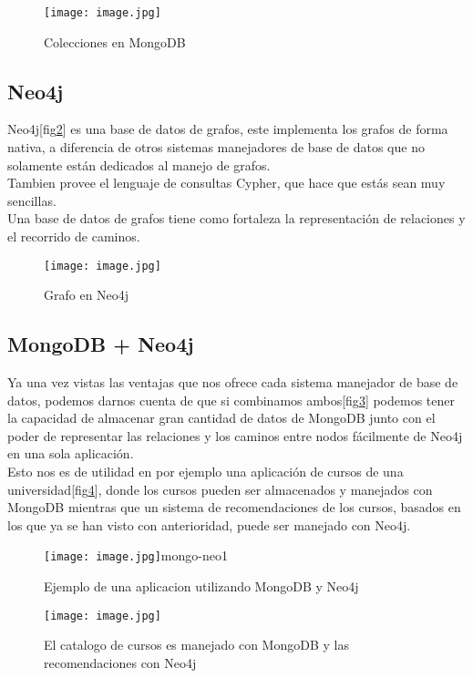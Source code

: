 \documentclass[conference,compsoc]{IEEEtran}
\begin{document}
\begin{figure}[!h]
\centering
\texttt{[image: image.jpg]}
\caption{Colecciones en MongoDB \cite{art11}}
\label{mongo_colecciones}
\end{figure}


\subsection{Neo4j}
Neo4j[fig\ref{neo-nodos}] es una base de datos de grafos, este implementa los grafos de forma nativa, a diferencia de otros sistemas manejadores de base de datos que no solamente están dedicados al manejo de grafos.\cite{art2}
\\
Tambien provee el lenguaje de consultas Cypher, que hace que estás sean muy sencillas.
\\
Una base de datos de grafos tiene como fortaleza la representación de relaciones y el recorrido de caminos.

\begin{figure}[!h]
\centering
\texttt{[image: image.jpg]}
\caption{Grafo en Neo4j \cite{art12}}
\label{neo-nodos}
\end{figure}

\subsection{MongoDB + Neo4j}
Ya una vez vistas las ventajas que nos ofrece cada sistema manejador de base de datos, podemos darnos cuenta de que si combinamos ambos[fig\ref{mongo-neo1}] podemos tener la capacidad de almacenar gran cantidad de datos de MongoDB junto con el poder de representar las relaciones y los caminos entre nodos fácilmente de Neo4j en una sola aplicación.
\\
Esto nos es de utilidad en por ejemplo una aplicación de cursos de una universidad[fig\ref{mongo-neo2}], donde los cursos pueden ser almacenados y manejados con MongoDB mientras que un sistema de recomendaciones de los cursos, basados en los que ya se han visto con anterioridad, puede ser manejado con Neo4j.

\begin{figure}[!h]
\centering
\texttt{[image: image.jpg]}{mongo-neo1}
\caption{Ejemplo de una aplicacion utilizando MongoDB y Neo4j\cite{art13}}
\label{mongo-neo1}
\end{figure}

\begin{figure}[!h]
\centering
\texttt{[image: image.jpg]}
\caption{El catalogo de cursos es manejado con MongoDB y las recomendaciones con Neo4j\cite{art13}}
\label{mongo-neo2}
\end{figure}
\end{document}

